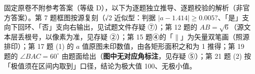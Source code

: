 
\begin{gktip}
固定原卷不附参考答案（等级 D），以下为逐题独立推导、逐题校验的解析（非官方答案）。第 7 题框图按源复刻（√2 近似型：判据 \(|a-1.414|\geqslant 0.005?\)、「是」支向下回环、「否」支向右输出，见试题文件存疑 ⑦）；第 12 题的 \(AB=\sqrt{6}\)（源文本层丢根号，以像素为准，见存疑 ②）；第 15 题④的「\(\parallel\)」为矢量双笔画（照源排印）；第 17 题 (1) 的 \(a\) 值原图未印数值，由各矩形面积之和为 1 推得；第 19 题的 \(\angle BAC=60^{\circ}\) 由题面给出（\textbf{图中无对应角标注}，见存疑 ⑤）；第 21 题 (2) 按「极值须在区间内取到」口径，结论为极大值 100、无极小值。
\end{gktip}

